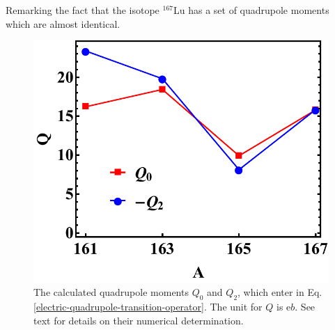 


Remarking the fact that the isotope $^{167}$Lu has a set of quadrupole moments which are almost identical.
\begin{figure}
    \centering
    \includegraphics[scale=0.65]{Chapters/Figures/Lu-exp-energies/fig19.pdf}
    \caption{The calculated quadrupole moments $Q_0$ and $Q_2$, which enter in Eq. \ref{electric-quadrupole-transition-operator}. The unit for $Q$ is $\mathrm{e}b$. See text for details on their numerical determination.}
    \label{quadrupole-moments-fit-numerical-results}
\end{figure}

